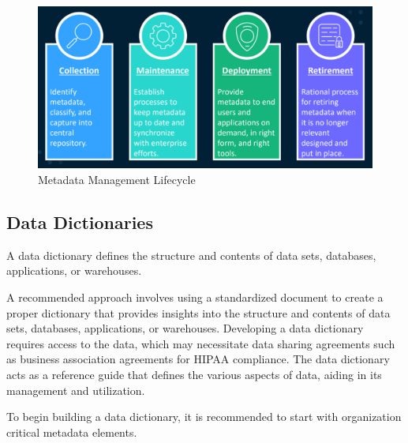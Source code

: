 \begin{figure}[H]
    \centering
    \includegraphics[scale=0.58]{images/Metadata Management Lifecycle.png}
    \caption{Metadata Management Lifecycle}
    \label{Metadata Management Lifecycle}
\end{figure}

\subsection{Data Dictionaries}
A data dictionary defines the structure and contents of data sets, databases, applications, or warehouses.

A recommended approach involves using a standardized document to create a proper dictionary that provides insights into the structure and contents of data sets, databases, applications, or warehouses. Developing a data dictionary requires access to the data, which may necessitate data sharing agreements such as business association agreements for HIPAA compliance. The data dictionary acts as a reference guide that defines the various aspects of data, aiding in its management and utilization. 

To begin building a data dictionary, it is recommended to start with organization critical metadata elements. 

